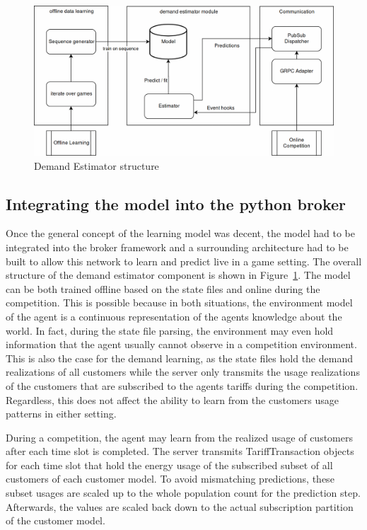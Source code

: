 \begin{figure}[h]
    \centering
    \includegraphics[width=1.0\linewidth]{img/UsageEstimator.png}
    \caption{Demand Estimator structure}
    \label{fig:DemandEstimator}
\end{figure}

\subsection{Integrating the model into the python broker}%
\label{sub:integrating_the_model_into_the_python_broker}

Once the general concept of the learning model was decent, the model had to be integrated into the broker framework and
a surrounding architecture had to be built to allow this network to learn and predict live in a game setting.
The overall structure of the demand estimator component is shown in Figure~\ref{fig:DemandEstimator}. The model can be
both trained offline based on the state files and online during the competition. This is possible because in both
situations, the environment model of the agent is a continuous representation of the agents knowledge about the world.
In fact, during the state file parsing, the environment may even hold information that the agent usually cannot observe
in a competition environment. This is also the case for the demand learning, as the state files hold the demand
realizations of all customers while the server  only transmits the usage realizations of the
customers that are subscribed to the agents tariffs during the competition. Regardless, this does not affect the ability to learn from the
customers usage patterns in either setting.

During a competition, the agent may learn from the realized usage of
customers after each time slot is completed. The server transmits TariffTransaction objects for each time slot that hold
the energy usage of the subscribed subset of all customers of each customer model. To avoid mismatching predictions,
these subset usages are scaled up to the whole population count for the prediction step. Afterwards, the values are
scaled back down to the actual subscription partition of the customer model.

